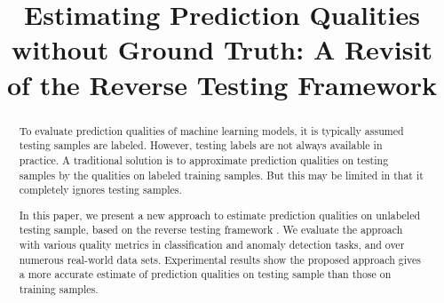 \documentclass[10pt,a4paper,conference]{IEEEtran}
\begin{document}
\title{Estimating Prediction Qualities without 
Ground Truth: A Revisit of the Reverse Testing Framework}

\author{
\and
{}
\and 
{}
}

\maketitle

\begin{abstract}
To evaluate prediction qualities of machine learning models, 
it is typically assumed testing samples are labeled. 
However, testing labels are not always available in practice. 
A traditional solution is to approximate prediction qualities 
on testing samples by the qualities on labeled training samples. 
But this may be limited in that it completely ignores 
testing samples. 

In this paper, we present a new approach to estimate prediction 
qualities on unlabeled testing sample, based on the reverse 
testing framework \cite{fan2006reverse}. 
We evaluate the approach with various quality metrics in classification 
and anomaly detection tasks, and over numerous real-world data sets. 
Experimental results show the proposed approach gives a more 
accurate estimate of prediction qualities on testing sample than 
those on training samples. 
\end{abstract}


\IEEEpeerreviewmaketitle








\end{document}

